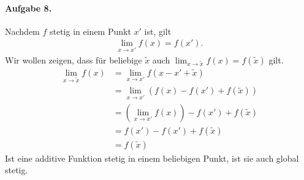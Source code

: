 \documentclass{article}
\begin{document}
\paragraph{Aufgabe 8.} Nachdem $f$ stetig in einem Punkt $x'$ ist, gilt 
\begin{align*}
    \lim_{x \to x'} f(x) = f(x').
\end{align*}
Wir wollen zeigen, dass für beliebige $\tilde{x}$ auch $\lim_{x \to \tilde{x}}f(x) = f(\tilde{x})$ gilt.
\begin{align*}
    \lim_{x \to \tilde{x}} f(x) &= \lim_{x \to x'} f(x - x' + \tilde{x}) \\
    &= \lim_{x \to x'} (f(x) - f(x') + f(\tilde{x})) \\
    &= (\lim_{x \to x'}f(x)) - f(x') + f(\tilde{x}) \\
    &= f(x') - f(x') + f(\tilde{x}) \\
    &= f(\tilde{x})
\end{align*}
Ist eine additive Funktion stetig in einem beliebigen Punkt, ist sie auch global stetig.
\end{document}
